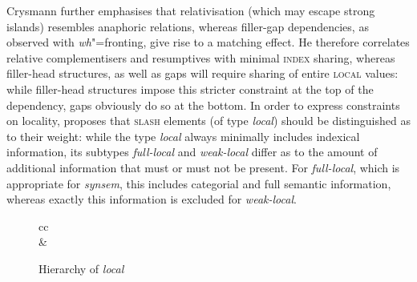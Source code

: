 \documentclass[output=paper
	        ,collection
	        ,collectionchapter
 	        ,biblatex
                ,babelshorthands
                ,newtxmath
                ,draftmode
                ,colorlinks, citecolor=brown
]{langscibook}
\begin{document}
{\noindent
Crysmann further emphasises that relativisation (which may escape
strong islands) resembles anaphoric relations, whereas filler-gap
dependencies, as observed with \emph{wh}"=fronting, give rise to a matching
effect. He therefore correlates relative complementisers and
resumptives with minimal \textsc{index} sharing, whereas filler-head
structures, as well as gaps will require sharing of entire
\textsc{local} values: while filler-head structures impose this
stricter constraint at the top of the dependency, gaps obviously do so
at the bottom. In order to express constraints on locality,
\citet{Crysmann:12} proposes that \textsc{slash} elements (of type
\textit{local}) should be distinguished as to their weight: while the
type \textit{local} always minimally includes indexical information,
its subtypes \textit{full-local} and \textit{weak-local} differ as to
the amount of additional information that must or must not be
present. For \textit{full-local}, which is appropriate for
\textit{synsem}, this includes categorial and full semantic
information, whereas exactly this information is excluded for
\textit{weak-local}.



\begin{figure}[htb]
  \centering
  
  \begin{tabular}{cc}
    \\[4em]
    &
  \end{tabular}

  
  
  \caption{\label{fig:local}Hierarchy of \textit{local} \citep{Crysmann:12}}
  
\end{figure}

}
\end{document}
